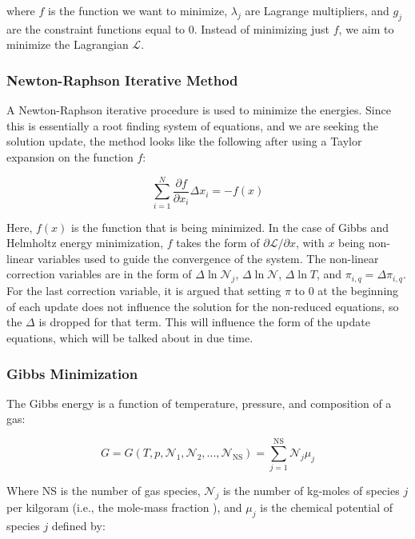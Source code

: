 \documentclass[10pt]{article}
\begin{document}
\begin{flushleft}
where $f$ is the function we want to minimize, $\lambda_j$ are Lagrange multipliers, and $g_j$ are the constraint functions equal to 0. Instead of minimizing just $f$, we aim to minimize the Lagrangian $\mathcal{L}$.

\subsubsection{Newton-Raphson Iterative Method}

A Newton-Raphson iterative procedure is used to minimize the energies. Since this is essentially a root finding system of equations, and we are seeking the solution update, the method looks like the following after using a Taylor expansion on the function $f$:

\begin{equation}
    \sum_{i=1}^N \frac{\partial f}{\partial x_i} \Delta x_i = -f(x)
    \label{newton}
\end{equation}

Here, $f(x)$ is the function that is being minimized. In the case of Gibbs and Helmholtz energy minimization, $f$ takes the form of $\partial \mathcal{L} / \partial x$, with $x$ being non-linear variables used to guide the convergence of the system. The non-linear correction variables are in the form of $\Delta \ln \mathcal{N}_j$, $\Delta \ln \mathcal{N}$, $\Delta \ln T$, and $\pi_{i,q} = \Delta \pi_{i,q}$. For the last correction variable, it is argued that setting $\pi$ to 0 at the beginning of each update does not influence the solution for the non-reduced equations, so the $\Delta$ is dropped for that term. This will influence the form of the update equations, which will be talked about in due time.

\subsubsection{Gibbs Minimization}

The Gibbs energy is a function of temperature, pressure, and composition of a gas:

\begin{equation}
    G = G(T, p, \mathcal{N}_1, \mathcal{N}_2, ... , \mathcal{N}_\text{NS}) = \sum_{j=1}^\text{NS}\mathcal{N}_j \mu_j
    \label{gibbs}
\end{equation}

Where NS is the number of gas species, $\mathcal{N}_j$ is the number of kg-moles of species $j$ per kilgoram (i.e., the mole-mass fraction ), and $\mu_j$ is the chemical potential of species $j$ defined by:


\end{flushleft}
\end{document}
